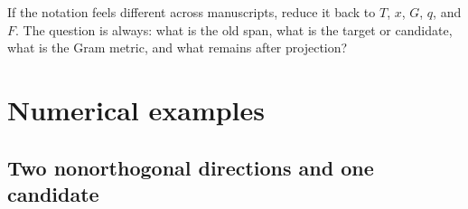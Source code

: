\documentclass[10pt,twocolumn]{article}
\begin{document}
\begin{intuitionbox}
If the notation feels different across manuscripts, reduce it back to $T$, $x$, $G$, $q$, and $F$. The question is always: what is the old span, what is the target or candidate, what is the Gram metric, and what remains after projection?
\end{intuitionbox}

\appendix
\section{Numerical examples}

\subsection{Two nonorthogonal directions and one candidate}
\end{document}

